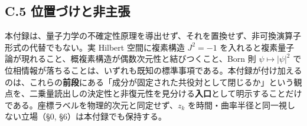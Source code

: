 \documentclass[11pt,a4paper]{ltjsarticle}
\begin{document}
\subsection{C.5
位置づけと非主張}\label{c.5-ux4f4dux7f6eux3065ux3051ux3068ux975eux4e3bux5f35}

本付録は、量子力学の不確定性原理を導出せず、それを置換せず、非可換演算子形式の代替でもない。実
Hilbert 空間に複素構造 \(J^2=-1\)
を入れると複素量子論が現れること、概複素構造が偶数次元性と結びつくこと、Born
則 \(\psi\mapsto|\psi|^2\)
で位相情報が落ちることは、いずれも既知の標準事項である。本付録が付け加えるのは、これらの\textbf{前段}にある「成分が固定された共役対として閉じるか」という観点を、二乗量読出しの決定性と非復元性を見分ける\textbf{入口}として明示することだけである。座標ラベルを物理的次元と同定せず、\(z_k\)
を時間・曲率半径と同一視しない立場（§0, §6）は本付録でも保持する。
\end{document}
